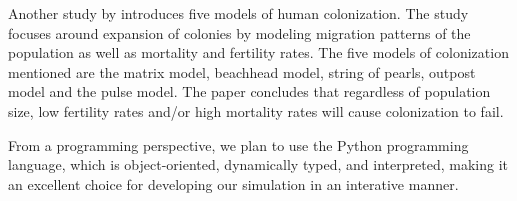 \documentclass[12pt]{article}
\begin{document}
Another study by \cite{moore2001evaluating} introduces five models of human colonization.  The study focuses around expansion of colonies by modeling migration patterns of the population as well as mortality and fertility rates.  The five models of colonization mentioned are the matrix model, beachhead model, string of pearls, outpost model and the pulse model.  The paper concludes that regardless of population size, low fertility rates and/or high mortality rates will cause colonization to fail.  

From a programming perspective, we plan to use the Python programming language,
which is object-oriented, dynamically typed, and interpreted, making it an
excellent choice for developing our simulation in an interative manner.

\clearpage
{}

\end{document}
